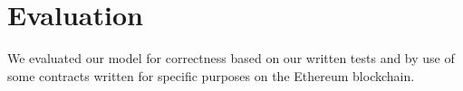 \section{Evaluation}
We evaluated our model for correctness based on our written tests and by use of
some contracts written for specific purposes on the Ethereum blockchain.
